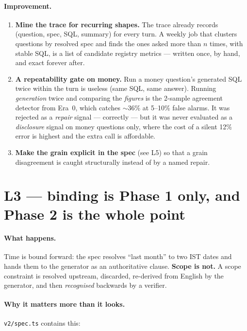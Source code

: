 \documentclass[11pt,a4paper]{report}
\newcommand{\file}[1]{\texttt{\small #1}}
\begin{document}
\paragraph{Improvement.}
\begin{enumerate}[leftmargin=*,itemsep=1pt]
\item \textbf{Mine the trace for recurring shapes.} The trace already records
      (question, spec, SQL, summary) for every turn. A weekly job that clusters questions by
      resolved spec and finds the ones asked more than $n$ times, with stable SQL, is a list of
      candidate registry metrics --- written once, by hand, and exact forever after.
\item \textbf{A repeatability gate on money.} Run a money question's generated SQL twice within the
      turn is useless (same SQL, same answer). Running \emph{generation} twice and comparing the
      \emph{figures} is the 2-sample agreement detector from Era~0, which catches $\sim$36\% at
      5--10\% false alarms. It was rejected as a \emph{repair} signal --- correctly --- but it was
      never evaluated as a \emph{disclosure} signal on money questions only, where the cost of a
      silent 12\% error is highest and the extra call is affordable.
\item \textbf{Make the grain explicit in the spec} (see L5) so that a grain disagreement is caught
      structurally instead of by a named repair.
\end{enumerate}

\section{L3 --- binding is Phase 1 only, and Phase 2 is the whole point}
\label{sec:lim-binding}

\paragraph{What happens.} Time is bound forward: the spec resolves ``last month'' to two IST dates
and hands them to the generator as an authoritative clause. \textbf{Scope is not.} A scope
constraint is resolved upstream, discarded, re-derived from English by the generator, and then
\emph{recognised} backwards by a verifier.

\paragraph{Why it matters more than it looks.} \file{v2/spec.ts} contains this:
\end{document}
